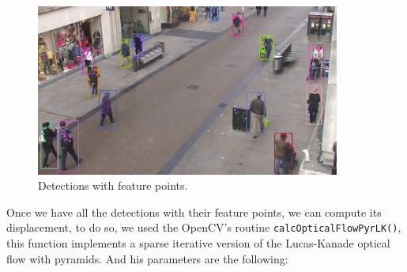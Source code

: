 %


\begin{figure}[H]
\centering         
\includegraphics[width=10cm]{intro/pounts.jpg}
\caption{Detections with feature points.} \label{solution3}
\end{figure}

 




Once we have all the detections with their feature points, we can compute its displacement, to do so,  we used the OpenCV's routine \texttt{calcOpticalFlowPyrLK()}, this function implements a sparse iterative version of the Lucas-Kanade optical flow with pyramids. And his parameters are the following:
 
